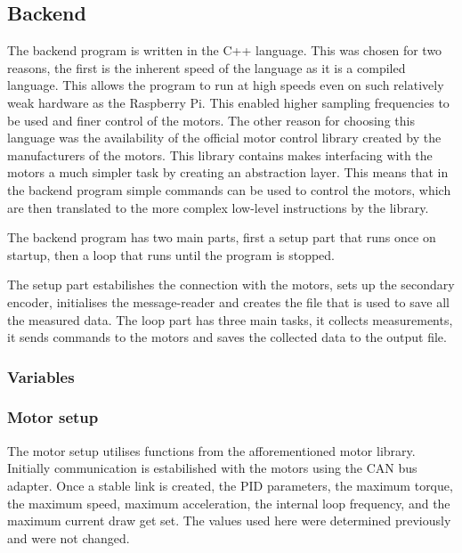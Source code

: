 \documentclass[12pt]{article}
\begin{document}
\subsection{Backend}
The backend program is written in the C++ language. This was chosen for two reasons, the first is the inherent speed of the language as it is a compiled language. This allows the program to run at high speeds even on such relatively weak hardware as the Raspberry Pi. This enabled higher sampling frequencies to be used and finer control of the motors. The other reason for choosing this language was the availability of the official motor control library created by the manufacturers of the motors. This library contains makes interfacing with the motors a much simpler task by creating an abstraction layer. This means that in the backend program simple commands can be used to control the motors, which are then translated to the more complex low-level instructions by the library.

The backend program has two main parts, first a setup part that runs once on startup, then a loop that runs until the program is stopped.

The setup part estabilishes the connection with the motors, sets up the secondary encoder, initialises the message-reader and creates the file that is used to save all the measured data. The loop part has three main tasks, it collects measurements, it sends commands to the motors and saves the collected data to the output file.  

\subsubsection{Variables}
\subsubsection{Motor setup}
The motor setup utilises functions from the afforementioned motor library. Initially communication is estabilished with the motors using the CAN bus adapter. Once a stable link is created, the PID parameters, the maximum torque, the maximum speed, maximum acceleration, the internal loop frequency, and the maximum current draw get set. The values used here were determined previously and were not changed. 
\end{document}
